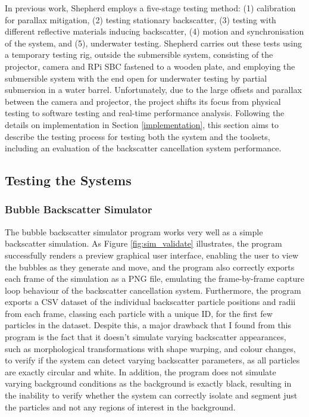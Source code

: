 In previous work, Shepherd employs a five-stage testing method: (1) calibration for parallax mitigation, (2) testing stationary backscatter, (3) testing with different reflective materials inducing backscatter, (4) motion and synchronisation of the system, and (5), underwater testing. Shepherd carries out these tests using a temporary testing rig, outside the submersible system, consisting of the projector, camera and RPi SBC fastened to a wooden plate, and employing the submersible system with the end open for underwater testing by partial submersion in a water barrel. Unfortunately, due to the large offsets and parallax between the camera and projector, the project shifts its focus from physical testing to software testing and real-time performance analysis. Following the details on implementation in Section \ref{implementation}, this section aims to describe the testing process for testing both the system and the toolsets, including an evaluation of the backscatter cancellation system performance.

\subsection{Testing the Systems}

\subsubsection{Bubble Backscatter Simulator}

The bubble backscatter simulator program works very well as a simple backscatter simulation. As Figure \ref{fig:sim_validate} illustrates, the program successfully renders a preview graphical user interface, enabling the user to view the bubbles as they generate and move, and the program also correctly exports each frame of the simulation as a PNG file, emulating the frame-by-frame capture loop behaviour of the backscatter cancellation system. Furthermore, the program exports a CSV dataset of the individual backscatter particle positions and radii from each frame, classing each particle with a unique ID, for the first few particles in the dataset. Despite this, a major drawback that I found from this program is the fact that it doesn't simulate varying backscatter appearances, such as morphological transformations with shape warping, and colour changes, to verify if the system can detect varying backscatter parameters, as all particles are exactly circular and white. In addition, the program does not simulate varying background conditions as the background is exactly black, resulting in the inability to verify whether the system can correctly isolate and segment just the particles and not any regions of interest in the background.

